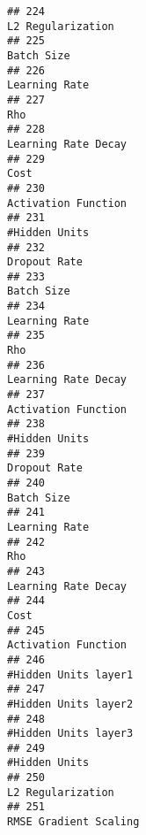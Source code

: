 \documentclass[
]{article}
\begin{document}
\begin{verbatim}
## 224                                                                       L2 Regularization
## 225                                                                              Batch Size
## 226                                                                           Learning Rate
## 227                                                                                     Rho
## 228                                                                     Learning Rate Decay
## 229                                                                                    Cost
## 230                                                                     Activation Function
## 231                                                                           #Hidden Units
## 232                                                                            Dropout Rate
## 233                                                                              Batch Size
## 234                                                                           Learning Rate
## 235                                                                                     Rho
## 236                                                                     Learning Rate Decay
## 237                                                                     Activation Function
## 238                                                                           #Hidden Units
## 239                                                                            Dropout Rate
## 240                                                                              Batch Size
## 241                                                                           Learning Rate
## 242                                                                                     Rho
## 243                                                                     Learning Rate Decay
## 244                                                                                    Cost
## 245                                                                     Activation Function
## 246                                                                    #Hidden Units layer1
## 247                                                                    #Hidden Units layer2
## 248                                                                    #Hidden Units layer3
## 249                                                                           #Hidden Units
## 250                                                                       L2 Regularization
## 251                                                                   RMSE Gradient Scaling

\end{verbatim}
\end{document}
